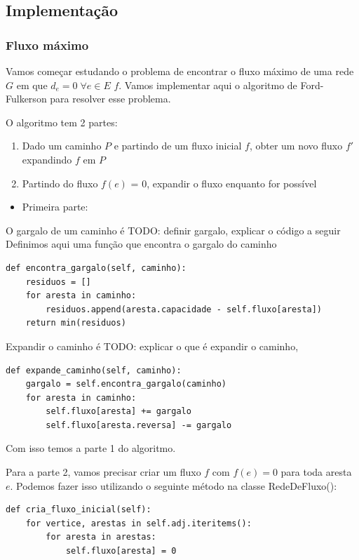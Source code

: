 \documentclass[11pt]{article}
\begin{document}
\subsection{Implementação}
\label{sec-1-4}

\subsubsection{Fluxo máximo}
\label{sec-1-4-1}

Vamos começar estudando o problema de encontrar o fluxo máximo de uma
rede $G$ em que $d_e = 0 \; \forall e \in E$ $f$. Vamos implementar aqui o
algoritmo de Ford-Fulkerson para resolver esse problema.

O algoritmo tem 2 partes:

\begin{enumerate}
\item Dado um caminho $P$ e partindo de um fluxo inicial $f$, obter um
novo fluxo $f'$ expandindo $f$ em $P$
\item Partindo do fluxo $f(e)$ = 0, expandir o fluxo enquanto for possível
\end{enumerate}


\begin{itemize}
\item Primeira parte:
\end{itemize}

O gargalo de um caminho é TODO: definir gargalo, explicar o código a seguir
Definimos aqui uma função que encontra o gargalo do caminho
\begin{verbatim}
def encontra_gargalo(self, caminho):
    residuos = []
    for aresta in caminho:
        residuos.append(aresta.capacidade - self.fluxo[aresta])
    return min(residuos)
\end{verbatim}

Expandir o caminho é TODO: explicar o que é expandir o caminho,
\begin{verbatim}
def expande_caminho(self, caminho):
    gargalo = self.encontra_gargalo(caminho)
    for aresta in caminho:
        self.fluxo[aresta] += gargalo
        self.fluxo[aresta.reversa] -= gargalo
\end{verbatim}

Com isso temos a parte 1 do algoritmo.

Para a parte 2, vamos precisar criar um fluxo $f$ com $f(e) = 0$ para
toda aresta $e$. Podemos fazer isso utilizando o seguinte método na
classe RedeDeFluxo():
\begin{verbatim}
def cria_fluxo_inicial(self):
    for vertice, arestas in self.adj.iteritems():
        for aresta in arestas:
            self.fluxo[aresta] = 0
\end{verbatim}
\end{document}
